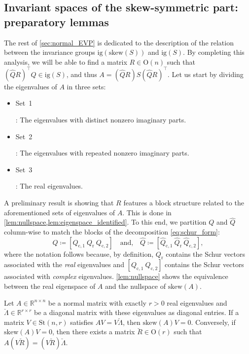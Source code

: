 \documentclass[10pt,twoside,dvipsnames]{siamart1116}
\numberwithin{algorithm}{section}
\numberwithin{equation}{section}
\newcommand{\wordlabel}[2]{\hypertarget{#1}{#2}}
\begin{document}
\subsection{Invariant spaces of the skew-symmetric part: preparatory lemmas} The rest of \cref{sec:normal_EVP} is dedicated to the description of the relation between the invariance groups $\mathrm{ig}(\mathrm{skew}(S))$ and $\mathrm{ig}(S)$. By completing this analysis, we will be able to find a matrix $R\in\mathrm{O}(n)$ such that $ (\widehat{Q} R)^\top Q\in \mathrm{ig}(S)$, and thus $A = (\widehat{Q}R)S(\widehat{Q}R)^\top $. Let us start by dividing the eigenvalues of $A$ in three sets:
	\begin{itemize}
	\item \wordlabel{set1}{Set~1}: The eigenvalues with distinct nonzero imaginary parts.
	\item \wordlabel{set2}{Set~2}: The eigenvalues with repeated nonzero imaginary parts.
	\item \wordlabel{set3}{Set~3}: The real eigenvalues.
	\end{itemize}
	A preliminary result is showing that $R$ features a block structure related to the aforementioned sets of eigenvalues of $A$. This is done in \cref{lem:nullspace,lem:eigenspace_identified}. To this end, we partition $Q$ and $\widehat{Q}$ column-wise to match the blocks of the decomposition \eqref{eq:schur_form}:
	\begin{equation*}
		Q\coloneq\left[Q_{\mathrm{c},1}\ Q_\mathrm{r} \ Q_{\mathrm{c},2}\right]\quad\text{and,}\quad\widehat{Q}\coloneq[\widehat{Q}_{\mathrm{c},1}\ \widehat{Q}_\mathrm{r} \ \widehat{Q}_{\mathrm{c},2}],
	\end{equation*}
	where the notation follows because, by definition, $Q_\mathrm{r}$ contains the Schur vectors associated with the \emph{real} eigenvalues and $[Q_{\mathrm{c},1} \ Q_{\mathrm{c},2}]$ contains the Schur vectors associated with \emph{complex} eigenvalues. \cref{lem:nullspace} shows the equivalence between the real eigenspace of $A$ and the nullspace of $\mathrm{skew}(A)$.
\begin{lemma}\label{lem:nullspace}
Let $A\in\mathbb{R}^{n\times n}$ be a normal matrix with exactly $r>0$ real eigenvalues and $\breve{\Lambda}\in\mathbb{R}^{r\times r}$ be a diagonal matrix with these eigenvalues as diagonal entries. If a matrix $V\in \mathrm{St}(n,r)$ satisfies $AV = V\breve{\Lambda}$, then $\mathrm{skew}(A)V = 0$. Conversely, if $\mathrm{skew}(A)V = 0$, then there exists a matrix $\breve{R}\in\mathrm{O}(r)$ such that $A(V\breve{R}) = (V\breve{R})\breve{\Lambda}$.
	\end{lemma}
\end{document}

